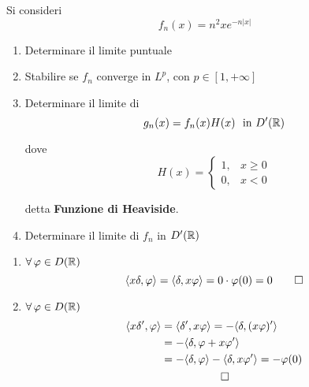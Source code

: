 Si consideri
\begin{equation*}
f_{n}(x) = n^{2} xe^{ - n| x| }
\end{equation*}
\begin{enumerate}
\item Determinare il limite puntuale
\item Stabilire se $f_{n}$ converge in $L^{p}$, con $p\in [ 1, + \infty ]$
\item Determinare il limite di\begin{equation*}
g_{n}(x) = f_{n}(x) H(x) \ \ \text{in} \ D'(\mathbb{R})
\end{equation*}

dove\begin{equation*}
H(x) = \begin{cases}
1, & x\geqslant 0\\
0, & x < 0
\end{cases}
\end{equation*}

detta \textbf{Funzione di Heaviside}.
\item Determinare il limite di $f_{n}$ in $D'(\mathbb{R})$
\end{enumerate}
\ParteSoluzioni
\Soluzione
\begin{enumerate}
\item $\forall \varphi \in D(\RR)$\begin{equation*}
\langle x\delta ,\varphi \rangle = \langle \delta ,x\varphi \rangle = 0\cdot \varphi (0) = 0\qed 
\end{equation*}
\item $\forall \varphi \in D(\RR)$\begin{gather*}
\begin{aligned}
\langle x\delta ',\varphi \rangle  & = \langle \delta ',x\varphi \rangle = - \langle \delta ,(x\varphi) '\rangle \\
 & = - \langle \delta ,\varphi + x\varphi '\rangle \\
 & = - \langle \delta ,\varphi \rangle - \langle \delta ,x\varphi '\rangle = - \varphi (0)
\end{aligned}\\
\qed 
\end{gather*}
\end{enumerate}
\Soluzione

